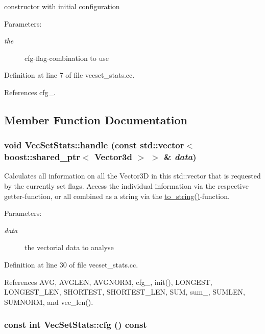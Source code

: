 constructor with initial configuration \begin{Desc}
\item[Parameters:]
\begin{description}
\item[{\em the}]cfg-flag-combination to use \end{description}
\end{Desc}


Definition at line 7 of file vecset\_\-stats.cc.

References cfg\_\-.

\subsection{Member Function Documentation}
\hypertarget{class_vec_set_stats_cf9ea6b5b6b3880f6a55f68c3546b859}{
\subsubsection[handle]{\setlength{\rightskip}{0pt plus 5cm}void VecSetStats::handle (const std::vector$<$ boost::shared\_\-ptr$<$ Vector3d $>$ $>$ \& {\em data})}}
\label{class_vec_set_stats_cf9ea6b5b6b3880f6a55f68c3546b859}


Calculates all information on all the Vector3D in this std::vector that is requested by the currently set flags. Access the individual information via the respective getter-function, or all combined as a string via the \hyperlink{class_vec_set_stats_1618681fee0ab61e61243be352a4cee5}{to\_\-string()}-function. \begin{Desc}
\item[Parameters:]
\begin{description}
\item[{\em data}]the vectorial data to analyse \end{description}
\end{Desc}


Definition at line 30 of file vecset\_\-stats.cc.

References AVG, AVGLEN, AVGNORM, cfg\_\-, init(), LONGEST, LONGEST\_\-LEN, SHORTEST, SHORTEST\_\-LEN, SUM, sum\_\-, SUMLEN, SUMNORM, and vec\_\-len().\hypertarget{class_vec_set_stats_8d51d3b79744c15c0fa669abbad1d469}{
\subsubsection[cfg]{\setlength{\rightskip}{0pt plus 5cm}const int VecSetStats::cfg () const}}
\label{class_vec_set_stats_8d51d3b79744c15c0fa669abbad1d469}


